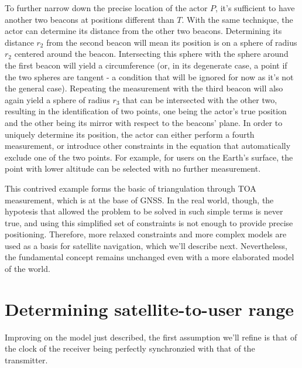 To further narrow down the precise location of the actor $P$, it's sufficient to
have another two beacons at positions different than $T$. With the same
technique, the actor can determine its distance from the other two beacons.
Determining its distance $r_2$ from the second beacon will mean its position is
on a sphere of radius $r_2$ centered around the beacon. Intersecting this sphere
with the sphere around the first beacon will yield a circumference (or, in its
degenerate case, a point if the two spheres are tangent - a condition that will
be ignored for now as it's not the general case). Repeating the measurement with
the third beacon will also again yield a sphere of radius $r_3$ that can be
intersected with the other two, resulting in the identification of two points,
one being the actor's true position and the other being its mirror with respect
to the beacons' plane. In order to uniquely determine its position, the actor
can either perform a fourth measurement, or introduce other constraints in the
equation that automatically exclude one of the two points. For example, for
users on the Earth's surface, the point with lower altitude can be selected with
no further measurement.

\par

This contrived example forms the basic of triangulation through TOA measurement,
which is at the base of GNSS. In the real world, though, the hypotesis that
allowed the problem to be solved in such simple terms is never true, and using
this simplified set of constraints is not enough to provide precise positioning.
Therefore, more relaxed constraints and more complex models are used as a basis
for satellite navigation, which we'll describe next. Nevertheless, the
fundamental concept remains unchanged even with a more elaborated model of the
world.

\section{Determining satellite-to-user range}
Improving on the model just described, the first assumption we'll refine is that
of the clock of the receiver being perfectly synchronzied with that of the
transmitter.

